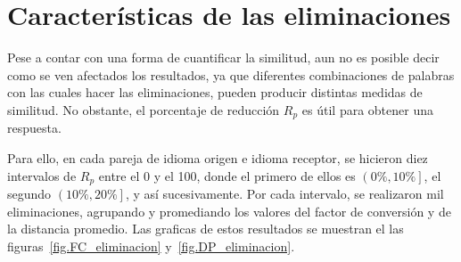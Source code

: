 
\section{Características de las eliminaciones}


Pese a contar con una forma de cuantificar la similitud, aun no es posible decir como se ven afectados los resultados, ya que diferentes combinaciones de palabras con las cuales hacer las eliminaciones, pueden producir distintas medidas de similitud.  No obstante, el porcentaje de reducción $R_{p}$ es útil para obtener una respuesta.

Para ello, en cada pareja de idioma origen e idioma receptor, se hicieron diez intervalos de $R_{p}$ entre el 0 y el 100, donde el primero de ellos es $\left(0\%, 10\% \right]$, el segundo $\left(10\%, 20\% \right]$, y así sucesivamente. Por cada intervalo,  se realizaron mil eliminaciones, agrupando y promediando los valores del factor de conversión y de la distancia promedio. Las graficas de estos resultados se muestran el las figuras~\ref{fig.FC_eliminacion} y~\ref{fig.DP_eliminacion}.


